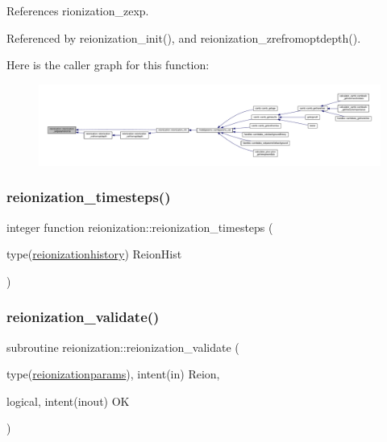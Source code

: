 References rionization\+\_\+zexp.



Referenced by reionization\+\_\+init(), and reionization\+\_\+zrefromoptdepth().

Here is the caller graph for this function\+:
\nopagebreak
\begin{figure}[H]
\begin{center}
\leavevmode
\includegraphics[width=350pt]{namespacereionization_aee52456a0e9c89ddc33d45ae3d14a484_icgraph}
\end{center}
\end{figure}
\mbox{\label{namespacereionization_adedd398d9dbfdc65012047bdfe5b9043}} 
\subsubsection{\texorpdfstring{reionization\+\_\+timesteps()}{reionization\_timesteps()}}
{\footnotesize\ttfamily integer function reionization\+::reionization\+\_\+timesteps (\begin{DoxyParamCaption}\item[{type(\mbox{\hyperlink{structreionization_1_1reionizationhistory}{reionizationhistory}})}]{Reion\+Hist }\end{DoxyParamCaption})}

\mbox{\label{namespacereionization_a3b0809c8b733201a4293d2bd47d81398}} 
\subsubsection{\texorpdfstring{reionization\+\_\+validate()}{reionization\_validate()}}
{\footnotesize\ttfamily subroutine reionization\+::reionization\+\_\+validate (\begin{DoxyParamCaption}\item[{type(\mbox{\hyperlink{structreionization_1_1reionizationparams}{reionizationparams}}), intent(in)}]{Reion,  }\item[{logical, intent(inout)}]{OK }\end{DoxyParamCaption})}



